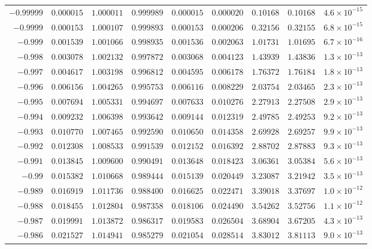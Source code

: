 \documentclass[12pt]{extarticle}
\theoremstyle{plain}
\theoremstyle{remark}
\begin{document}
{\begin{longtable}{rcccccccc}
$-0.99999$ & $0.000015$ & $1.000011$ & $0.999989$ & $0.000015$ & $0.000020$ & $0.10168$ & $0.10168$ & $4.6\times10^{-15}$ \\
$-0.9999$ & $0.000153$ & $1.000107$ & $0.999893$ & $0.000153$ & $0.000206$ & $0.32156$ & $0.32155$ & $6.8\times10^{-15}$ \\
$-0.999$ & $0.001539$ & $1.001066$ & $0.998935$ & $0.001536$ & $0.002063$ & $1.01731$ & $1.01695$ & $6.7\times10^{-16}$ \\
$-0.998$ & $0.003078$ & $1.002132$ & $0.997872$ & $0.003068$ & $0.004123$ & $1.43939$ & $1.43836$ & $1.3\times10^{-13}$ \\
$-0.997$ & $0.004617$ & $1.003198$ & $0.996812$ & $0.004595$ & $0.006178$ & $1.76372$ & $1.76184$ & $1.8\times10^{-13}$ \\
$-0.996$ & $0.006156$ & $1.004265$ & $0.995753$ & $0.006116$ & $0.008229$ & $2.03754$ & $2.03465$ & $2.3\times10^{-13}$ \\
$-0.995$ & $0.007694$ & $1.005331$ & $0.994697$ & $0.007633$ & $0.010276$ & $2.27913$ & $2.27508$ & $2.9\times10^{-13}$ \\
$-0.994$ & $0.009232$ & $1.006398$ & $0.993642$ & $0.009144$ & $0.012319$ & $2.49785$ & $2.49253$ & $9.2\times10^{-13}$ \\
$-0.993$ & $0.010770$ & $1.007465$ & $0.992590$ & $0.010650$ & $0.014358$ & $2.69928$ & $2.69257$ & $9.9\times10^{-13}$ \\
$-0.992$ & $0.012308$ & $1.008533$ & $0.991539$ & $0.012152$ & $0.016392$ & $2.88702$ & $2.87883$ & $9.3\times10^{-13}$ \\
$-0.991$ & $0.013845$ & $1.009600$ & $0.990491$ & $0.013648$ & $0.018423$ & $3.06361$ & $3.05384$ & $5.6\times10^{-13}$ \\
$-0.99$ & $0.015382$ & $1.010668$ & $0.989444$ & $0.015139$ & $0.020449$ & $3.23087$ & $3.21942$ & $3.5\times10^{-13}$ \\
$-0.989$ & $0.016919$ & $1.011736$ & $0.988400$ & $0.016625$ & $0.022471$ & $3.39018$ & $3.37697$ & $1.0\times10^{-12}$ \\
$-0.988$ & $0.018455$ & $1.012804$ & $0.987358$ & $0.018106$ & $0.024490$ & $3.54262$ & $3.52756$ & $1.1\times10^{-12}$ \\
$-0.987$ & $0.019991$ & $1.013872$ & $0.986317$ & $0.019583$ & $0.026504$ & $3.68904$ & $3.67205$ & $4.3\times10^{-13}$ \\
$-0.986$ & $0.021527$ & $1.014941$ & $0.985279$ & $0.021054$ & $0.028514$ & $3.83012$ & $3.81113$ & $9.0\times10^{-13}$ \\

\end{longtable}}
\end{document}
